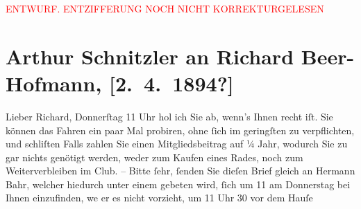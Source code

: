 
\begin{center}
            \textcolor{red}{ENTWURF. ENTZIFFERUNG NOCH NICHT KORREKTURGELESEN}
                      \end{center}
            
               \section[Arthur Schnitzler an Richard Beer-Hofmann, {[}2. 4. 1894?{]}]{ Arthur Schnitzler an Richard Beer-Hofmann, {[}2. 4. 1894?{]}}\nopagebreak{}\rehead{ }\begin{ledgroupsized}[t]{13cm}\normalsize\beginnumbering{} \toendnotes[C]{\smallbreak\pagebreak[2]} 
\toendnotes[C]{\smallbreak}\pstart{}{\pb}Lieber Richard,\pend\pstart
           Donnerſtag 11 Uhr hol ich Sie ab, wenn’s Ihnen recht iſt. Sie können das Fahren
                    ein paar Mal probiren, ohne ſich im geringſten zu verpflichten, und schli{\geminationm}ſten Falls zahlen Sie einen Mit{\pb}gliedsbeitrag auf ¼ Jahr, wodurch Sie zu
                         gar nichts genötigt werden, weder zum
                    Kaufen eines Rades, noch zum Weiterverbleiben im Club. –\pend
           \pstart
           Bitte ſehr, ſenden Sie dieſen Brief gleich {\pb}an Hermann Bahr, welcher hiedurch unter
                    einem gebeten wird, ſich um 11 am Donnerstag bei Ihnen einzufinden, we{\geminationn} er es nicht vorzieht, um 11 Uhr 30
                    vor dem Hauſe \label{K_L00309_1v}
\end{ledgroupsized}
